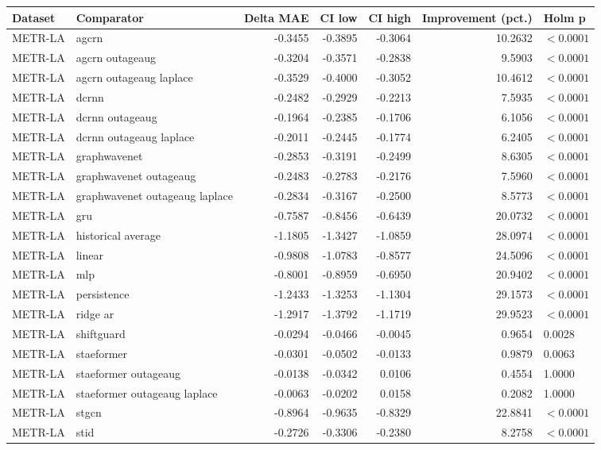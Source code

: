 \begin{tabular}{llrrrrl}
\toprule
Dataset & Comparator & Delta MAE & CI low & CI high & Improvement (pct.) & Holm p \\
\midrule
METR-LA & agcrn & -0.3455 & -0.3895 & -0.3064 & 10.2632 & $<0.0001$ \\
METR-LA & agcrn outageaug & -0.3204 & -0.3571 & -0.2838 & 9.5903 & $<0.0001$ \\
METR-LA & agcrn outageaug laplace & -0.3529 & -0.4000 & -0.3052 & 10.4612 & $<0.0001$ \\
METR-LA & dcrnn & -0.2482 & -0.2929 & -0.2213 & 7.5935 & $<0.0001$ \\
METR-LA & dcrnn outageaug & -0.1964 & -0.2385 & -0.1706 & 6.1056 & $<0.0001$ \\
METR-LA & dcrnn outageaug laplace & -0.2011 & -0.2445 & -0.1774 & 6.2405 & $<0.0001$ \\
METR-LA & graphwavenet & -0.2853 & -0.3191 & -0.2499 & 8.6305 & $<0.0001$ \\
METR-LA & graphwavenet outageaug & -0.2483 & -0.2783 & -0.2176 & 7.5960 & $<0.0001$ \\
METR-LA & graphwavenet outageaug laplace & -0.2834 & -0.3167 & -0.2500 & 8.5773 & $<0.0001$ \\
METR-LA & gru & -0.7587 & -0.8456 & -0.6439 & 20.0732 & $<0.0001$ \\
METR-LA & historical average & -1.1805 & -1.3427 & -1.0859 & 28.0974 & $<0.0001$ \\
METR-LA & linear & -0.9808 & -1.0783 & -0.8577 & 24.5096 & $<0.0001$ \\
METR-LA & mlp & -0.8001 & -0.8959 & -0.6950 & 20.9402 & $<0.0001$ \\
METR-LA & persistence & -1.2433 & -1.3253 & -1.1304 & 29.1573 & $<0.0001$ \\
METR-LA & ridge ar & -1.2917 & -1.3792 & -1.1719 & 29.9523 & $<0.0001$ \\
METR-LA & shiftguard & -0.0294 & -0.0466 & -0.0045 & 0.9654 & 0.0028 \\
METR-LA & staeformer & -0.0301 & -0.0502 & -0.0133 & 0.9879 & 0.0063 \\
METR-LA & staeformer outageaug & -0.0138 & -0.0342 & 0.0106 & 0.4554 & 1.0000 \\
METR-LA & staeformer outageaug laplace & -0.0063 & -0.0202 & 0.0158 & 0.2082 & 1.0000 \\
METR-LA & stgcn & -0.8964 & -0.9635 & -0.8329 & 22.8841 & $<0.0001$ \\
METR-LA & stid & -0.2726 & -0.3306 & -0.2380 & 8.2758 & $<0.0001$ \\

\end{tabular}
